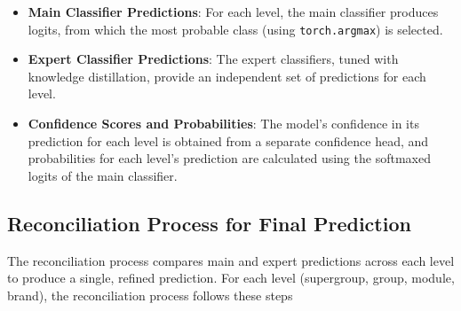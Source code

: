 \documentclass[9pt,a4paper,twoside]{rho-class/rho}
\begin{document}
\begin{itemize}
    \item \textbf{Main Classifier Predictions}: For each level, the main classifier produces logits, from which the most probable class (using \verb|torch.argmax|) is selected.
    \item \textbf{Expert Classifier Predictions}: The expert classifiers, tuned with knowledge distillation, provide an independent set of predictions for each level.
    \item \textbf{Confidence Scores and Probabilities}: The model’s confidence in its prediction for each level is obtained from a separate confidence head, and probabilities for each level’s prediction are calculated using the softmaxed logits of the main classifier.
\end{itemize}


 \subsection{Reconciliation Process for Final Prediction}

 The reconciliation process compares main and expert predictions across each level to produce a single, refined prediction. For each level (supergroup, group, module, brand), the reconciliation process follows these steps
\end{document}

